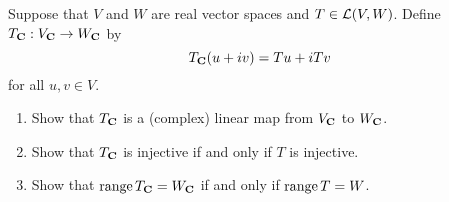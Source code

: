\begin{exercise}
    Suppose that $V$ and $W$ are real vector spaces and $T \in \mathcal{L}(V,W)$. Define $T_{\mathbf{C}} : V_{\mathbf{C}} \to W_{\mathbf{C}}$ by
    $$T_{\mathbf{C}}(u + iv) = Tu + iTv$$
    for all $u,v \in V$.
    \begin{enumerate}[label=(\alph*)]
        \item Show that $T_{\mathbf{C}}$ is a (complex) linear map from $V_{\mathbf{C}}$ to $W_{\mathbf{C}}$.
        \item Show that $T_{\mathbf{C}}$ is injective if and only if $T$ is injective.
        \item Show that $\operatorname{\text{range}} T_{\mathbf{C}} = W_{\mathbf{C}}$ if and only if $\operatorname{\text{range}} T = W$.\\
    \end{enumerate}
\end{exercise}


